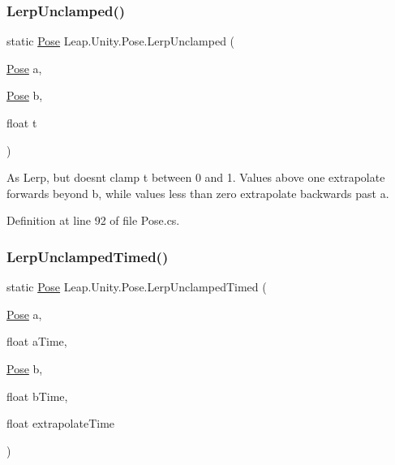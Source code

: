 \subsubsection{\texorpdfstring{LerpUnclamped()}{LerpUnclamped()}}
{\footnotesize\ttfamily static \mbox{\hyperlink{struct_leap_1_1_unity_1_1_pose}{Pose}} Leap.\+Unity.\+Pose.\+Lerp\+Unclamped (\begin{DoxyParamCaption}\item[{\mbox{\hyperlink{struct_leap_1_1_unity_1_1_pose}{Pose}}}]{a,  }\item[{\mbox{\hyperlink{struct_leap_1_1_unity_1_1_pose}{Pose}}}]{b,  }\item[{float}]{t }\end{DoxyParamCaption})\hspace{0.3cm}{\ttfamily [static]}}



As Lerp, but doesn\textquotesingle{}t clamp t between 0 and 1. Values above one extrapolate forwards beyond b, while values less than zero extrapolate backwards past a. 



Definition at line 92 of file Pose.\+cs.

\mbox{\label{struct_leap_1_1_unity_1_1_pose_a2d4f86a6cbde7e36020570737e7cb4b2}} 
\subsubsection{\texorpdfstring{LerpUnclampedTimed()}{LerpUnclampedTimed()}}
{\footnotesize\ttfamily static \mbox{\hyperlink{struct_leap_1_1_unity_1_1_pose}{Pose}} Leap.\+Unity.\+Pose.\+Lerp\+Unclamped\+Timed (\begin{DoxyParamCaption}\item[{\mbox{\hyperlink{struct_leap_1_1_unity_1_1_pose}{Pose}}}]{a,  }\item[{float}]{a\+Time,  }\item[{\mbox{\hyperlink{struct_leap_1_1_unity_1_1_pose}{Pose}}}]{b,  }\item[{float}]{b\+Time,  }\item[{float}]{extrapolate\+Time }\end{DoxyParamCaption})\hspace{0.3cm}{\ttfamily [static]}}



